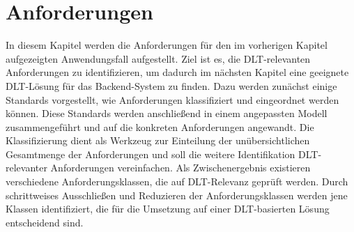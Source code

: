 \chapter{Anforderungen}
\label{ch:requirements}
In diesem Kapitel werden die Anforderungen für den im vorherigen Kapitel aufgezeigten Anwendungsfall aufgestellt. Ziel ist es, die \ac{DLT}-relevanten Anforderungen zu identifizieren, um dadurch im nächsten Kapitel eine geeignete \ac{DLT}-Lösung für das Backend-System zu finden. Dazu werden zunächst einige Standards vorgestellt, wie Anforderungen klassifiziert und eingeordnet werden können. Diese Standards werden anschließend in einem angepassten Modell zusammengeführt und auf die konkreten Anforderungen angewandt. Die Klassifizierung dient als Werkzeug zur Einteilung der unübersichtlichen Gesamtmenge der Anforderungen und soll die weitere Identifikation \ac{DLT}-relevanter Anforderungen vereinfachen. Als Zwischenergebnis existieren verschiedene Anforderungsklassen, die auf \ac{DLT}-Relevanz geprüft werden. Durch schrittweises Ausschließen und Reduzieren der Anforderungsklassen werden jene Klassen identifiziert, die für die Umsetzung auf einer \ac{DLT}-basierten Lösung entscheidend sind.

%
%
